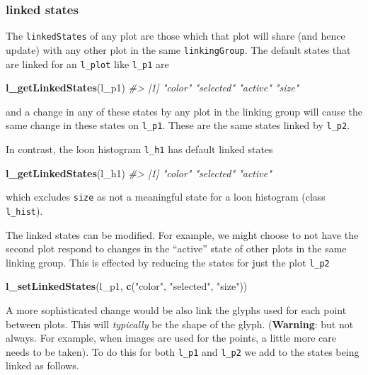 \documentclass[]{article}
\newenvironment{Shaded}{\begin{snugshade}}{\end{snugshade}}
\newcommand{\KeywordTok}[1]{\textcolor[rgb]{0.13,0.29,0.53}{\textbf{#1}}}
\newcommand{\StringTok}[1]{\textcolor[rgb]{0.31,0.60,0.02}{#1}}
\newcommand{\CommentTok}[1]{\textcolor[rgb]{0.56,0.35,0.01}{\textit{#1}}}
\newcommand{\NormalTok}[1]{#1}
\begin{document}
\subsubsection{linked states}\label{linked-states}

The \texttt{linkedStates} of any plot are those which that plot will
share (and hence update) with any other plot in the same
\texttt{linkingGroup}. The default states that are linked for an
\texttt{l\_plot} like \texttt{l\_p1} are

\begin{Shaded}
\begin{Highlighting}[]
\KeywordTok{l_getLinkedStates}\NormalTok{(l_p1)}
\CommentTok{#> [1] "color"    "selected" "active"   "size"}
\end{Highlighting}
\end{Shaded}

and a change in any of these states by any plot in the linking group
will cause the same change in these states on \texttt{l\_p1}. These are
the same states linked by \texttt{l\_p2}.

In contrast, the loon histogram \texttt{l\_h1} has default linked states

\begin{Shaded}
\begin{Highlighting}[]
\KeywordTok{l_getLinkedStates}\NormalTok{(l_h1)}
\CommentTok{#> [1] "color"    "selected" "active"}
\end{Highlighting}
\end{Shaded}

which excludes \texttt{size} as not a meaningful state for a loon
histogram (class \texttt{l\_hist}).

The linked states can be modified. For example, we might choose to not
have the second plot respond to changes in the ``active'' state of other
plots in the same linking group. This is effected by reducing the states
for just the plot \texttt{l\_p2}

\begin{Shaded}
\begin{Highlighting}[]
\KeywordTok{l_setLinkedStates}\NormalTok{(l_p1,  }\KeywordTok{c}\NormalTok{(}\StringTok{"color"}\NormalTok{, }\StringTok{"selected"}\NormalTok{, }\StringTok{"size"}\NormalTok{))}
\end{Highlighting}
\end{Shaded}

A more sophisticated change would be also link the glyphs used for each
point between plots. This will \emph{typically} be the shape of the
glyph. (\textbf{Warning}: but not always. For example, when images are
used for the points, a little more care needs to be taken). To do this
for both \texttt{l\_p1} and \texttt{l\_p2} we add to the states being
linked as follows.
\end{document}
